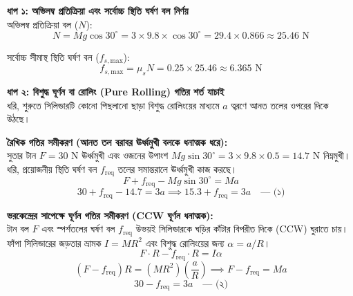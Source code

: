 \documentclass[12pt, a4paper]{article}
\begin{document}
\begin{tcolorbox}[solutionbox={সমাধান (Solution)}]
\begin{center}
\end{center}
\vspace{1em}
\noindent
\textbf{ধাপ ১: অভিলম্ব প্রতিক্রিয়া এবং সর্বোচ্চ স্থিতি ঘর্ষণ বল নির্ণয়} \\
অভিলম্ব প্রতিক্রিয়া বল ($N$):
\[ N = Mg \cos 30^\circ = 3 \times 9.8 \times \cos 30^\circ = 29.4 \times 0.866 \approx 25.46\text{ N} \]

সর্বোচ্চ সীমাস্থ স্থিতি ঘর্ষণ বল ($f_{s,\text{max}}$):
\[ f_{s,\text{max}} = \mu_s N = 0.25 \times 25.46 \approx 6.365\text{ N} \]

\vspace{0.5em}
\noindent
\textbf{ধাপ ২: বিশুদ্ধ ঘূর্ণন বা রোলিং (Pure Rolling) গতির শর্ত যাচাই} \\
ধরি, শুরুতে সিলিন্ডারটি কোনো পিছলানো ছাড়া বিশুদ্ধ রোলিংয়ের মাধ্যমে $a$ ত্বরণে আনত তলের ওপরের দিকে উঠছে।

\textbf{রৈখিক গতির সমীকরণ (আনত তল বরাবর ঊর্ধ্বমুখী বলকে ধনাত্মক ধরে):} \\
সুতার টান $F = 30\text{ N}$ ঊর্ধ্বমুখী এবং ওজনের উপাংশ $Mg \sin 30^\circ = 3 \times 9.8 \times 0.5 = 14.7\text{ N}$ নিম্নমুখী। ধরি, প্রয়োজনীয় স্থিতি ঘর্ষণ বল $f_{\text{req}}$ তলের সমান্তরালে ঊর্ধ্বমুখী কাজ করছে।
\[ F + f_{\text{req}} - Mg \sin 30^\circ = Ma \]
\[ 30 + f_{\text{req}} - 14.7 = 3a \implies 15.3 + f_{\text{req}} = 3a \quad \text{--- (১)} \]

\textbf{ভরকেন্দ্রের সাপেক্ষে ঘূর্ণন গতির সমীকরণ (CCW ঘূর্ণন ধনাত্মক):} \\
টান বল $F$ এবং স্পর্শতলের ঘর্ষণ বল $f_{\text{req}}$ উভয়ই সিলিন্ডারকে ঘড়ির কাঁটার বিপরীত দিকে (CCW) ঘুরাতে চায়। ফাঁপা সিলিন্ডারের জড়তার ভ্রামক $I = MR^2$ এবং বিশুদ্ধ রোলিংয়ের জন্য $\alpha = a / R$।
\[ F \cdot R - f_{\text{req}} \cdot R = I \alpha \]
\[ (F - f_{\text{req}})R = (MR^2)\left(\frac{a}{R}\right) \implies F - f_{\text{req}} = Ma \]
\[ 30 - f_{\text{req}} = 3a \quad \text{--- (২)} \]


\end{tcolorbox}
\end{document}
